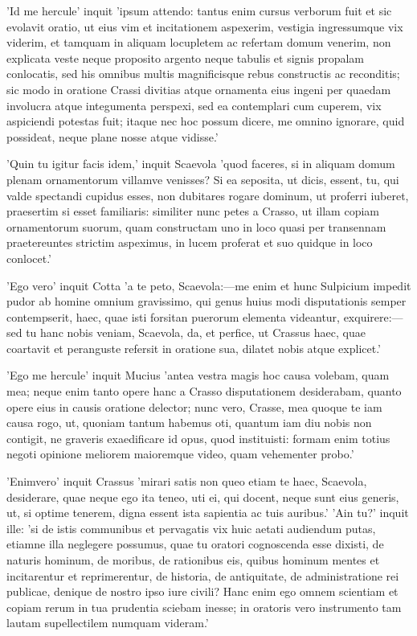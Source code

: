 'Id me hercule' inquit 'ipsum attendo: tantus enim cursus verborum fuit et sic evolavit oratio, ut eius vim et incitationem aspexerim, vestigia ingressumque vix viderim, et tamquam in aliquam locupletem ac refertam domum venerim, non explicata veste neque proposito argento neque tabulis et signis propalam conlocatis, sed his omnibus multis magnificisque rebus constructis ac reconditis; sic modo in oratione Crassi divitias atque ornamenta eius ingeni per quaedam involucra atque integumenta perspexi, sed ea contemplari cum cuperem, vix aspiciendi potestas fuit; itaque nec hoc possum dicere, me omnino ignorare, quid possideat, neque plane nosse atque vidisse.'

 'Quin tu igitur facis idem,' inquit Scaevola 'quod faceres, si in aliquam domum plenam ornamentorum villamve venisses? Si ea seposita, ut dicis, essent, tu, qui valde spectandi cupidus esses, non dubitares rogare dominum, ut proferri iuberet, praesertim si esset familiaris: similiter nunc petes a Crasso, ut illam copiam ornamentorum suorum, quam constructam uno in loco quasi per transennam praetereuntes strictim aspeximus, in lucem proferat et suo quidque in loco conlocet.'

 'Ego vero' inquit Cotta 'a te peto, Scaevola:—me enim et hunc Sulpicium impedit pudor ab homine omnium gravissimo, qui genus huius modi disputationis semper contempserit, haec, quae isti forsitan puerorum elementa videantur, exquirere:—sed tu hanc nobis veniam, Scaevola, da, et perfice, ut Crassus haec, quae coartavit et peranguste refersit in oratione sua, dilatet nobis atque explicet.'

 'Ego me hercule' inquit Mucius 'antea vestra magis hoc causa volebam, quam mea; neque enim tanto opere hanc a Crasso disputationem desiderabam, quanto opere eius in causis oratione delector; nunc vero, Crasse, mea quoque te iam causa rogo, ut, quoniam tantum habemus oti, quantum iam diu nobis non contigit, ne graveris exaedificare id opus, quod instituisti: formam enim totius negoti opinione meliorem maioremque video, quam vehementer probo.'

 'Enimvero' inquit Crassus 'mirari satis non queo etiam te haec, Scaevola, desiderare, quae neque ego ita teneo, uti ei, qui docent, neque sunt eius generis, ut, si optime tenerem, digna essent ista sapientia ac tuis auribus.' 'Ain tu?' inquit ille: 'si de istis communibus et pervagatis vix huic aetati audiendum putas, etiamne illa neglegere possumus, quae tu oratori cognoscenda esse dixisti, de naturis hominum, de moribus, de rationibus eis, quibus hominum mentes et incitarentur et reprimerentur, de historia, de antiquitate, de administratione rei publicae, denique de nostro ipso iure civili? Hanc enim ego omnem scientiam et copiam rerum in tua prudentia sciebam inesse; in oratoris vero instrumento tam lautam supellectilem numquam videram.'

